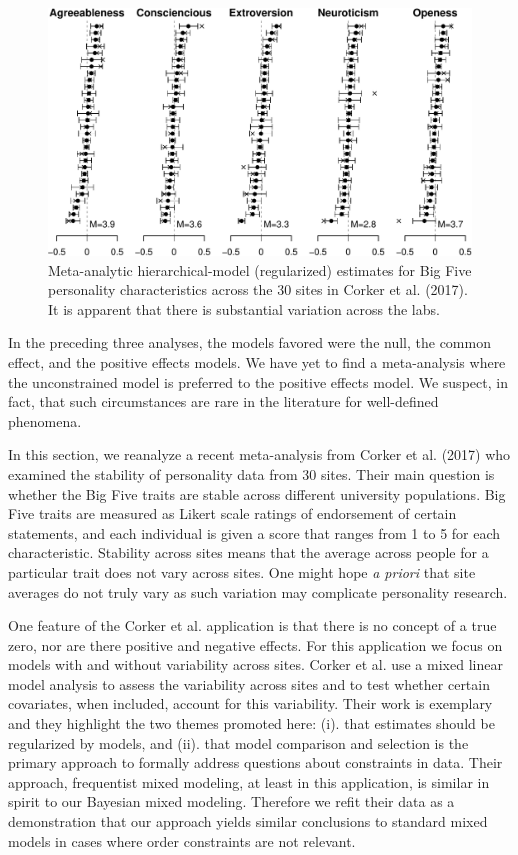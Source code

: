 \documentclass[english,man]{apa6}
\theoremstyle{definition}
\theoremstyle{definition}
\theoremstyle{remark}
\begin{document}
\begin{figure}[htbp]
\centering
\includegraphics{pBlind_files/figure-latex/corkerEst-1.pdf}
\caption{\label{fig:corkerEst}Meta-analytic hierarchical-model (regularized)
estimates for Big Five personality characteristics across the 30 sites
in Corker et al. (2017). It is apparent that there is substantial
variation across the labs.}
\end{figure}

In the preceding three analyses, the models favored were the null, the
common effect, and the positive effects models. We have yet to find a
meta-analysis where the unconstrained model is preferred to the positive
effects model. We suspect, in fact, that such circumstances are rare in
the literature for well-defined phenomena.

In this section, we reanalyze a recent meta-analysis from Corker et al.
(2017) who examined the stability of personality data from 30 sites.
Their main question is whether the Big Five traits are stable across
different university populations. Big Five traits are measured as Likert
scale ratings of endorsement of certain statements, and each individual
is given a score that ranges from 1 to 5 for each characteristic.
Stability across sites means that the average across people for a
particular trait does not vary across sites. One might hope \emph{a
priori} that site averages do not truly vary as such variation may
complicate personality research.

One feature of the Corker et al. application is that there is no concept
of a true zero, nor are there positive and negative effects. For this
application we focus on models with and without variability across
sites. Corker et al. use a mixed linear model analysis to assess the
variability across sites and to test whether certain covariates, when
included, account for this variability. Their work is exemplary and they
highlight the two themes promoted here: (i). that estimates should be
regularized by models, and (ii). that model comparison and selection is
the primary approach to formally address questions about constraints in
data. Their approach, frequentist mixed modeling, at least in this
application, is similar in spirit to our Bayesian mixed modeling.
Therefore we refit their data as a demonstration that our approach
yields similar conclusions to standard mixed models in cases where order
constraints are not relevant.
\end{document}
